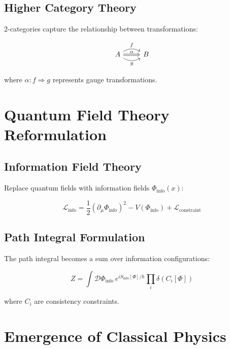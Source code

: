 \documentclass[12pt,a4paper]{article}
\begin{document}
\subsection{Higher Category Theory}

2-categories capture the relationship between transformations:

\begin{equation}
\begin{tikzcd}
A \arrow[r, "f", bend left] \arrow[r, "g"', bend right] & B
\arrow[Rightarrow, from=1-1, to=1-2, "\alpha"]
\end{tikzcd}
\end{equation}

where $\alpha: f \Rightarrow g$ represents gauge transformations.

\section{Quantum Field Theory Reformulation}

\subsection{Information Field Theory}

Replace quantum fields with information fields $\Phi_{\text{info}}(x)$:

\begin{equation}
\mathcal{L}_{\text{info}} = \frac{1}{2}(\partial_\mu \Phi_{\text{info}})^2 - V(\Phi_{\text{info}}) + \mathcal{L}_{\text{constraint}}
\end{equation}

\subsection{Path Integral Formulation}

The path integral becomes a sum over information configurations:

\begin{equation}
Z = \int \mathcal{D}\Phi_{\text{info}} \, e^{iS_{\text{info}}[\Phi]/\hbar} \prod_i \delta(C_i[\Phi])
\end{equation}

where $C_i$ are consistency constraints.

\section{Emergence of Classical Physics}
\end{document}
